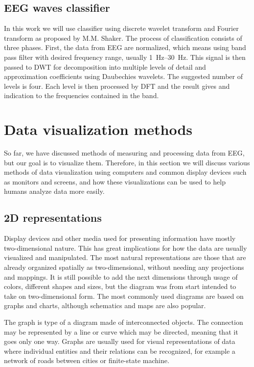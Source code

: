 \subsection{EEG waves classifier}
In this work we will use classifier using discrete wavelet transform and Fourier
transform as proposed by M.M. Shaker. \cite{eegWaveFt} The process of
classification consists of three phases. First, the data from EEG are
normalized, which means using band pass filter with desired frequency range,
usually \SIrange{1}{30}{\Hz}. This signal is then passed to DWT for
decomposition into multiple levels of detail and approximation
coefficients using Daubechies wavelets. The suggested number of levels is four.
Each level is then processed by DFT and the result gives and indication to the
frequencies contained in the band.

\section{Data visualization methods}
So far,  we have discussed methods of measuring and processing data from EEG,
but our goal is to visualize them. Therefore, in this section we will discuss
various methods of data visualization using computers and common display devices
such as monitors and screens, and how these visualizations can be used to help
humans analyze data more easily.

\subsection{2D representations}
Display devices and other media used for presenting information have mostly
two-dimensional nature. This has great implications for how the data are usually
visualized and manipulated. The most natural representations are those that are
already organized spatially as two-dimensional, without needing any projections
and mappings. It is still possible to add the next dimensions through usage of
colors, different shapes and sizes, but the diagram was from start intended to
take on two-dimensional form. The most commonly used diagrams are based on
graphs and charts, although schematics and maps are also popular.

The graph is type of a diagram made of interconnected objects. The connection
may be represented by a line or curve which may be directed, meaning that it
goes only one way. Graphs are usually used for visual representations of data
where individual entities and their relations can be recognized, for example a
network of roads between cities or finite-state machine.

